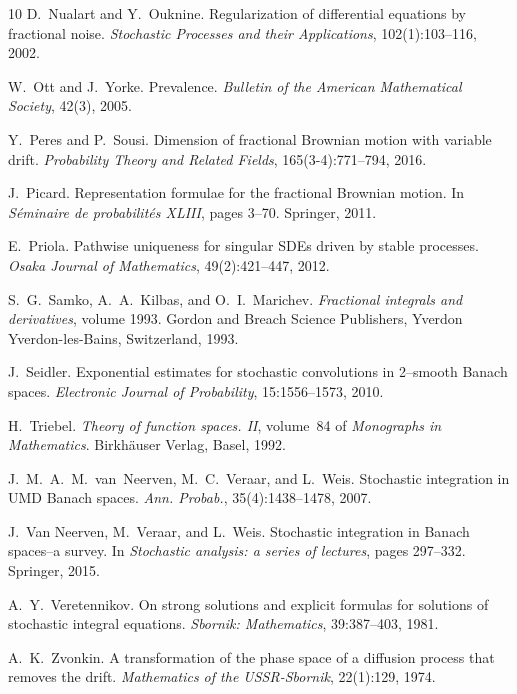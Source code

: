 \documentclass[10pt]{article}
\newcommand{\tmtextit}[1]{{\itshape{#1}}}
\begin{document}
\begin{thebibliography}{10}
  D.~Nualart  and  Y.~Ouknine.
  {\newblock}Regularization of differential equations by fractional noise.
  {\newblock}\tmtextit{Stochastic Processes and their Applications},
  102(1):103--116, 2002.{\newblock}
  
  W.~Ott  and  J.~Yorke. {\newblock}Prevalence.
  {\newblock}\tmtextit{Bulletin of the American Mathematical Society}, 42(3),
  2005.{\newblock}
  
  Y.~Peres  and  P.~Sousi. {\newblock}Dimension of
  fractional Brownian motion with variable drift.
  {\newblock}\tmtextit{Probability Theory and Related Fields},
  165(3-4):771--794, 2016.{\newblock}
  
  J.~Picard. {\newblock}Representation formulae for the
  fractional Brownian motion. {\newblock}In \tmtextit{S{\'e}minaire de
  probabilit{\'e}s XLIII},  pages  3--70. Springer, 2011.{\newblock}
  
  E.~Priola. {\newblock}Pathwise uniqueness for
  singular SDEs driven by stable processes. {\newblock}\tmtextit{Osaka Journal
  of Mathematics}, 49(2):421--447, 2012.{\newblock}
  
  S.~G.~Samko, A.~A.~Kilbas, and  O.~I.~Marichev.
  {\newblock}\tmtextit{Fractional integrals and derivatives},  volume  1993.
  {\newblock}Gordon and Breach Science Publishers, Yverdon Yverdon-les-Bains,
  Switzerland, 1993.{\newblock}
  
  J.~Seidler. {\newblock}Exponential estimates for
  stochastic convolutions in 2--smooth Banach spaces.
  {\newblock}\tmtextit{Electronic Journal of Probability}, 15:1556--1573,
  2010.{\newblock}
  
  H.~Triebel. {\newblock}\tmtextit{Theory of function
  spaces. II},  volume~84  of \tmtextit{Monographs in Mathematics}.
  {\newblock}Birkh{\"a}user Verlag, Basel, 1992.{\newblock}
  
  J.~M.~A.~M.~van~Neerven, M.~C.~Veraar, and 
  L.~Weis. {\newblock}Stochastic integration in UMD Banach spaces.
  {\newblock}\tmtextit{Ann. Probab.}, 35(4):1438--1478, 2007.{\newblock}
  
  J.~Van Neerven, M.~Veraar, and  L.~Weis.
  {\newblock}Stochastic integration in Banach spaces--a survey. {\newblock}In
  \tmtextit{Stochastic analysis: a series of lectures},  pages  297--332.
  Springer, 2015.{\newblock}
  
  A.~Y.~Veretennikov. {\newblock}On strong solutions
  and explicit formulas for solutions of stochastic integral equations.
  {\newblock}\tmtextit{Sbornik: Mathematics}, 39:387--403, 1981.{\newblock}
  
  A.~K.~Zvonkin. {\newblock}A transformation of the phase
  space of a diffusion process that removes the drift.
  {\newblock}\tmtextit{Mathematics of the USSR-Sbornik}, 22(1):129,
  1974.{\newblock}
\end{thebibliography}
\end{document}
